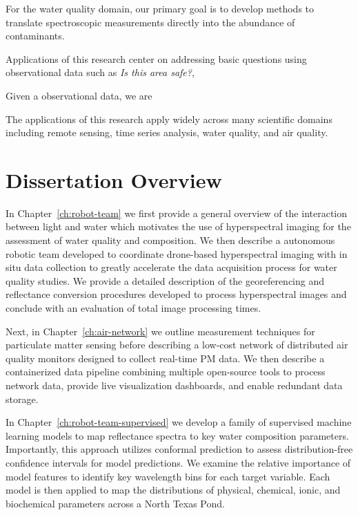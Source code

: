 For the water quality domain, our primary goal is to develop methods to translate
spectroscopic measurements directly into the abundance of contaminants. 



Applications of this research center on addressing basic questions using
observational data such as \textit{Is this area safe?}, 


Given a observational data, we are 

The applications of this research apply widely across many scientific domains
including remote sensing, time series analysis, water quality, and air quality.


\section{Dissertation Overview}

In Chapter~\ref{ch:robot-team} we first provide a general overview of the
interaction between light and water which motivates the use of hyperspectral imaging
for the assessment of water quality and composition. We then describe a
autonomous robotic team developed to coordinate drone-based hyperspectral imaging
with in situ data collection to greatly accelerate the data acquisition process
for water quality studies. We provide a detailed description of the
georeferencing and reflectance conversion procedures developed to process
hyperspectral images and conclude with an evaluation of total image processing times.

Next, in Chapter~\ref{ch:air-network} we outline measurement techniques for
particulate matter sensing before describing a low-cost network of distributed
air quality monitors designed to collect real-time PM data. We then describe a
containerized data pipeline combining multiple open-source tools to process
network data, provide live visualization dashboards, and enable redundant
data storage.

In Chapter~\ref{ch:robot-team-supervised} we develop a family of supervised
machine learning models to map reflectance spectra to key water composition
parameters. Importantly, this approach utilizes conformal prediction
to assess distribution-free confidence intervals for model predictions. We
examine the relative importance of model features to identify key wavelength
bins for each target variable. Each model is then applied to map the
distributions of physical, chemical, ionic, and biochemical parameters across a
North Texas Pond.

